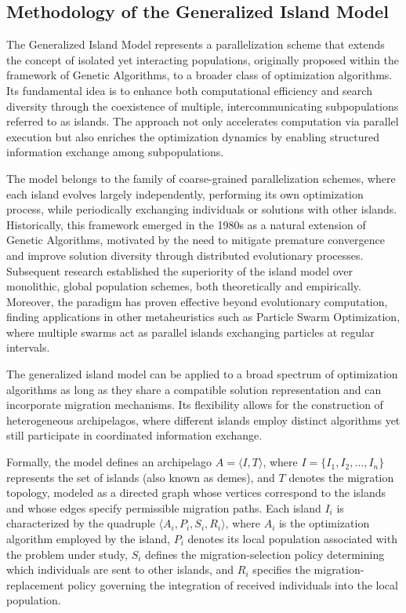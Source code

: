\subsection{Methodology of the Generalized Island Model}
\label{subsec:generalized_island_model}
The Generalized Island Model represents a parallelization scheme that extends the concept of isolated yet interacting populations, originally proposed within the framework of Genetic Algorithms, to a broader class of optimization algorithms. Its fundamental idea is to enhance both computational efficiency and search diversity through the coexistence of multiple, intercommunicating subpopulations referred to as islands. The approach not only accelerates computation via parallel execution but also enriches the optimization dynamics by enabling structured information exchange among subpopulations.

The model belongs to the family of coarse-grained parallelization schemes, where each island evolves largely independently, performing its own optimization process, while periodically exchanging individuals or solutions with other islands. Historically, this framework emerged in the 1980s as a natural extension of Genetic Algorithms, motivated by the need to mitigate premature convergence and improve solution diversity through distributed evolutionary processes. Subsequent research established the superiority of the island model over monolithic, global population schemes, both theoretically and empirically. Moreover, the paradigm has proven effective beyond evolutionary computation, finding applications in other metaheuristics such as Particle Swarm Optimization, where multiple swarms act as parallel islands exchanging particles at regular intervals.

The generalized island model can be applied to a broad spectrum of optimization algorithms as long as they share a compatible solution representation and can incorporate migration mechanisms. Its flexibility allows for the construction of heterogeneous archipelagos, where different islands employ distinct algorithms yet still participate in coordinated information exchange.

Formally, the model defines an archipelago \( A = \langle I, T \rangle \), where \( I = \{ I_1, I_2, \dots, I_n \} \) represents the set of islands (also known as demes), and \( T \) denotes the migration topology, modeled as a directed graph whose vertices correspond to the islands and whose edges specify permissible migration paths. Each island \( I_i \) is characterized by the quadruple \( \langle A_i, P_i, S_i, R_i \rangle \), where \( A_i \) is the optimization algorithm employed by the island, \( P_i \) denotes its local population associated with the problem under study, \( S_i \) defines the migration-selection policy determining which individuals are sent to other islands, and \( R_i \) specifies the migration-replacement policy governing the integration of received individuals into the local population.


